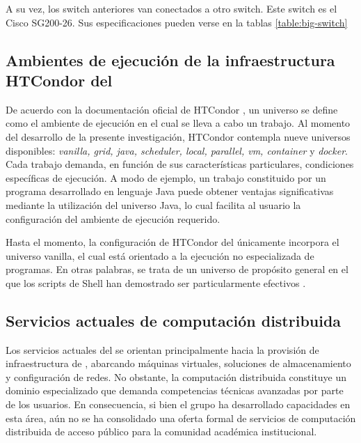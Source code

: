\noindent
A su vez, los switch anteriores van conectados a otro switch. Este switch es el Cisco SG200-26. Sus especificaciones pueden verse en la tablas \ref{table:big-switch}



\subsection{Ambientes de ejecución de la infraestructura HTCondor del \GRID}
\noindent{}
De acuerdo con la documentación oficial de HTCondor \citep{HTCondor-choosing-universe}, un universo se define como el ambiente de ejecución en el cual se lleva a cabo un trabajo. Al momento del desarrollo de la presente investigación, HTCondor contempla nueve universos disponibles: \textit{vanilla, grid, java, scheduler, local, parallel, vm, container} y \textit{docker}. Cada trabajo demanda, en función de sus características particulares, condiciones específicas de ejecución. A modo de ejemplo, un trabajo constituido por un programa desarrollado en lenguaje Java puede obtener ventajas significativas mediante la utilización del universo Java, lo cual facilita al usuario la configuración del ambiente de ejecución requerido.

Hasta el momento, la configuración de HTCondor del \GRID únicamente incorpora el universo vanilla, el cual está orientado a la ejecución no especializada de programas. En otras palabras, se trata de un universo de propósito general en el que los scripts de Shell han demostrado ser particularmente efectivos \citep{HTCondor-choosing-universe}.


\subsection{Servicios actuales de computación distribuida}
\noindent
Los servicios actuales del \GRID se orientan principalmente hacia la provisión de infraestructura de \TI, abarcando máquinas virtuales, soluciones de almacenamiento y configuración de redes. No obstante, la computación distribuida constituye un dominio especializado que demanda competencias técnicas avanzadas por parte de los usuarios. En consecuencia, si bien el grupo ha desarrollado capacidades en esta área, aún no se ha consolidado una oferta formal de servicios de computación distribuida de acceso público para la comunidad académica institucional.

%
